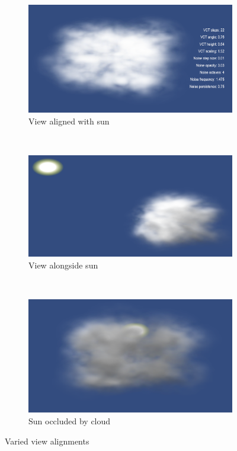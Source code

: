\begin{figure}[h]
\centering
	\begin{subfigure}[t]{\textwidth}
	\includegraphics[width=\textwidth]{../res/res3.png}
	\caption{View aligned with sun}
	\end{subfigure}
	~
	\begin{subfigure}[t]{\textwidth}
	\includegraphics[width=\textwidth]{../res/res3-1.png}
	\caption{View alongside sun}
	\end{subfigure}
	~
	\begin{subfigure}[t]{\textwidth}
	\includegraphics[width=\textwidth]{../res/res3-2.png}
	\caption{Sun occluded by cloud}
	\end{subfigure}
\caption{Varied view alignments}
\end{figure}

